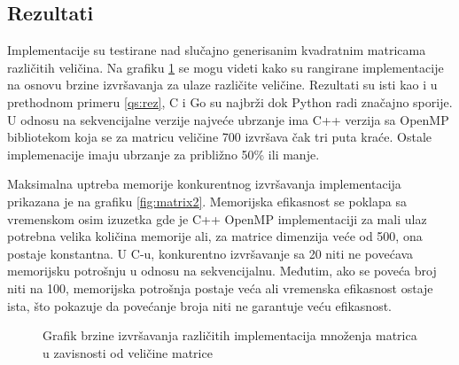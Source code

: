 \documentclass[12pt,oneside]{memoir}
\begin{document}
\subsection{Rezultati}
Implementacije su testirane nad slučajno generisanim kvadratnim matricama različitih veličina. Na grafiku \ref{fig:matrix} se mogu videti kako su rangirane implementacije na osnovu brzine izvršavanja za ulaze različite veličine. Rezultati su isti kao i u prethodnom primeru \ref{qs:rez}, C i Go su najbrži dok Python radi značajno sporije.  U odnosu na sekvencijalne verzije najveće ubrzanje ima C++ verzija sa OpenMP bibliotekom koja se za matricu veličine 700 izvršava čak tri puta kraće. Ostale implemenacije imaju ubrzanje za približno 50\% ili manje.

Maksimalna uptreba memorije konkurentnog izvršavanja implementacija prikazana je na grafiku \ref{fig:matrix2}. Memorijska efikasnost se poklapa sa vremenskom osim izuzetka gde je C++ OpenMP implementaciji za mali ulaz potrebna velika količina memorije ali, za matrice dimenzija veće od 500, ona postaje konstantna. U C-u, konkurentno izvršavanje sa 20 niti ne povećava memorijsku potrošnju u odnosu na sekvencijalnu. Međutim, ako se poveća broj niti na 100, memorijska potrošnja postaje veća ali vremenska efikasnost ostaje ista, što pokazuje da povećanje broja niti ne garantuje veću efikasnost.

\begin{figure}
\begin{center}


\caption{Grafik brzine izvršavanja različitih implementacija množenja matrica u zavisnosti od veličine matrice}
\label{fig:matrix}
\end{center}
\end{figure}
\end{document}
